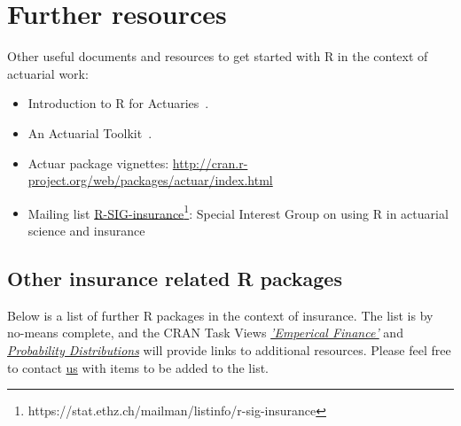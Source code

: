\documentclass{article}
\begin{document}
\section{Further resources}

Other useful documents and resources to get started with R in the
context of actuarial work:
\begin{itemize}
\item  Introduction to R for Actuaries~\cite{DeSilva2006}.

\item An Actuarial Toolkit~\cite{MaynardDeSilvaHollowayGesmannLauHarnett2006}.  

\item Actuar package vignettes: \url{http://cran.r-project.org/web/packages/actuar/index.html}
  
\item
  Mailing list
  \href{https://stat.ethz.ch/mailman/listinfo/r-sig-insurance}{R-SIG-insurance\footnote{\url{https://stat.ethz.ch/mailman/listinfo/r-sig-insurance}}}:
  Special Interest Group on using R in actuarial science and  insurance 
\end{itemize}




\subsection{Other insurance related R packages}

Below is a list of further R packages in the context of insurance. 
The list is by no-means complete, and the CRAN Task Views
\href{http://cran.r-project.org/web/views/Finance.html}{\emph{'Emperical
    Finance'}} and
\href{http://cran.r-project.org/web/views/Distributions.html}{\emph{Probability
    Distributions}} will provide links to additional resources. Please
feel free to contact \href{mailto:markus.gesmann@gmail.com}{us} with
items to be added to the list.
\end{document}
